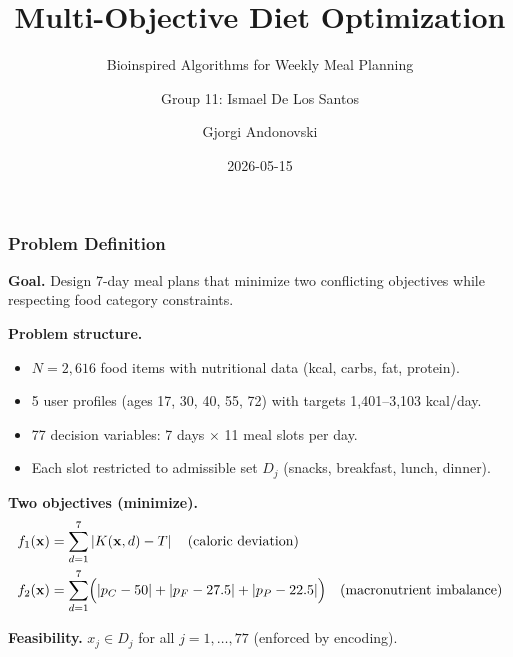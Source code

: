 \documentclass[aspectratio=169,10pt]{beamer}
\title[Multi-Objective Diet Optimization]{Multi-Objective Diet Optimization}
\subtitle{Bioinspired Algorithms for Weekly Meal Planning}
\author{Group 11: Ismael De Los Santos \and Gjorgi Andonovski}
\date{2026-05-15}
\begin{document}
\begin{frame}
  \titlepage
\end{frame}

\begin{frame}
\frametitle{Problem Definition}

\textbf{Goal.} Design 7-day meal plans that minimize two conflicting objectives while respecting food category constraints.

\vspace{0.3cm}

\textbf{Problem structure.}
\begin{itemize}
  \item $N=2{,}616$ food items with nutritional data (kcal, carbs, fat, protein).
  \item 5 user profiles (ages 17, 30, 40, 55, 72) with targets 1{,}401--3{,}103 kcal/day.
  \item 77 decision variables: 7 days $\times$ 11 meal slots per day.
  \item Each slot restricted to admissible set $D_j$ (snacks, breakfast, lunch, dinner).
\end{itemize}

\vspace{0.3cm}

\textbf{Two objectives (minimize).}
\begin{align*}
f_1(\mathbf{x}) &= \sum_{d=1}^{7} \left|K(\mathbf{x},d) - T\right|
\quad \text{(caloric deviation)} \\
f_2(\mathbf{x}) &= \sum_{d=1}^{7} \Bigl(\left|p_C-50\right| + \left|p_F-27.5\right| + \left|p_P-22.5\right|\Bigr)
\quad \text{(macronutrient imbalance)}
\end{align*}

\textbf{Feasibility.} $x_j \in D_j$ for all $j=1,\dots,77$ (enforced by encoding).

\end{frame}
\end{document}
